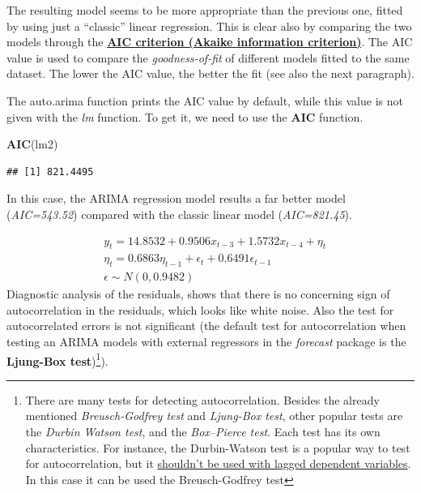 \documentclass[
]{article}
\newenvironment{Shaded}{\begin{snugshade}}{\end{snugshade}}
\newcommand{\KeywordTok}[1]{\textcolor[rgb]{0.13,0.29,0.53}{\textbf{#1}}}
\newcommand{\NormalTok}[1]{#1}
\begin{document}
The resulting model seems to be more appropriate than the previous one, fitted by using just a ``classic'' linear regression. This is clear also by comparing the two models through the \href{https://en.wikipedia.org/wiki/Akaike_information_criterion}{\textbf{AIC criterion (Akaike information criterion)}}. The AIC value is used to compare the \emph{goodness-of-fit} of different models fitted to the same dataset. The lower the AIC value, the better the fit (see also the next paragraph).

The auto.arima function prints the AIC value by default, while this value is not given with the \emph{lm} function. To get it, we need to use the \textbf{AIC} function.

\begin{Shaded}
\begin{Highlighting}[]
\KeywordTok{AIC}\NormalTok{(lm2)}
\end{Highlighting}
\end{Shaded}

\begin{verbatim}
## [1] 821.4495
\end{verbatim}

In this case, the ARIMA regression model results a far better model (\emph{AIC=543.52}) compared with the classic linear model (\emph{AIC=821.45}).

\[
\begin{aligned} 
& y_t = 14.8532 + 0.9506x_{t-3} + 1.5732x_{t-4} + \eta_t \\
& \eta_t = 0.6863\eta_{t-1} + \epsilon_t + 0.6491\epsilon_{t-1} \\
& \epsilon \sim N(0, 0.9482)
\end{aligned} 
\]
Diagnostic analysis of the residuals, shows that there is no concerning sign of autocorrelation in the residuals, which looks like white noise. Also the test for autocorrelated errors is not significant (the default test for autocorrelation when testing an ARIMA models with external regressors in the \emph{forecast} package is the \textbf{Ljung-Box test})\footnote{There are many tests for detecting autocorrelation. Besides the already mentioned \emph{Breusch-Godfrey test} and \emph{Ljung-Box test}, other popular tests are the \emph{Durbin Watson test}, and the \emph{Box--Pierce test}. Each test has its own characteristics. For instance, the Durbin-Watson test is a popular way to test for autocorrelation, but it \href{https://www.jstor.org/stable/pdf/1909870.pdf?refreqid=excelsior\%3A9526730d9debe4fa8f1a4d5fa601d523}{shouldn't be used with lagged dependent variables}. In this case it can be used the Breusch-Godfrey test}).
\end{document}
